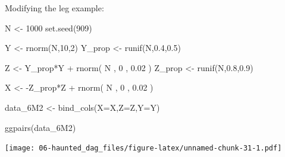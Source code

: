 \documentclass[
]{book}
\newenvironment{Shaded}{\begin{snugshade}}{\end{snugshade}}
\newcommand{\AttributeTok}[1]{\textcolor[rgb]{0.77,0.63,0.00}{#1}}
\newcommand{\DecValTok}[1]{\textcolor[rgb]{0.00,0.00,0.81}{#1}}
\newcommand{\FloatTok}[1]{\textcolor[rgb]{0.00,0.00,0.81}{#1}}
\newcommand{\FunctionTok}[1]{\textcolor[rgb]{0.00,0.00,0.00}{#1}}
\newcommand{\NormalTok}[1]{#1}
\newcommand{\OtherTok}[1]{\textcolor[rgb]{0.56,0.35,0.01}{#1}}
\newcommand{\SpecialCharTok}[1]{\textcolor[rgb]{0.00,0.00,0.00}{#1}}
\begin{document}
Modifying the leg example:

\begin{Shaded}
\begin{Highlighting}[]
\NormalTok{N }\OtherTok{\textless{}{-}} \DecValTok{1000} 
\FunctionTok{set.seed}\NormalTok{(}\DecValTok{909}\NormalTok{) }

\NormalTok{Y }\OtherTok{\textless{}{-}} \FunctionTok{rnorm}\NormalTok{(N,}\DecValTok{10}\NormalTok{,}\DecValTok{2}\NormalTok{)}
\NormalTok{Y\_prop }\OtherTok{\textless{}{-}} \FunctionTok{runif}\NormalTok{(N,}\FloatTok{0.4}\NormalTok{,}\FloatTok{0.5}\NormalTok{) }

\NormalTok{Z }\OtherTok{\textless{}{-}}\NormalTok{ Y\_prop}\SpecialCharTok{*}\NormalTok{Y }\SpecialCharTok{+} \FunctionTok{rnorm}\NormalTok{( N , }\DecValTok{0}\NormalTok{ , }\FloatTok{0.02}\NormalTok{ )}
\NormalTok{Z\_prop }\OtherTok{\textless{}{-}} \FunctionTok{runif}\NormalTok{(N,}\FloatTok{0.8}\NormalTok{,}\FloatTok{0.9}\NormalTok{) }

\NormalTok{X }\OtherTok{\textless{}{-}} \SpecialCharTok{{-}}\NormalTok{Z\_prop}\SpecialCharTok{*}\NormalTok{Z }\SpecialCharTok{+} \FunctionTok{rnorm}\NormalTok{( N , }\DecValTok{0}\NormalTok{ , }\FloatTok{0.02}\NormalTok{ )}

\NormalTok{data\_6M2 }\OtherTok{\textless{}{-}} \FunctionTok{bind\_cols}\NormalTok{(}\AttributeTok{X=}\NormalTok{X,}\AttributeTok{Z=}\NormalTok{Z,}\AttributeTok{Y=}\NormalTok{Y)}

\FunctionTok{ggpairs}\NormalTok{(data\_6M2)}
\end{Highlighting}
\end{Shaded}

\texttt{[image: 06-haunted\_dag\_files/figure-latex/unnamed-chunk-31-1.pdf]}
\end{document}
